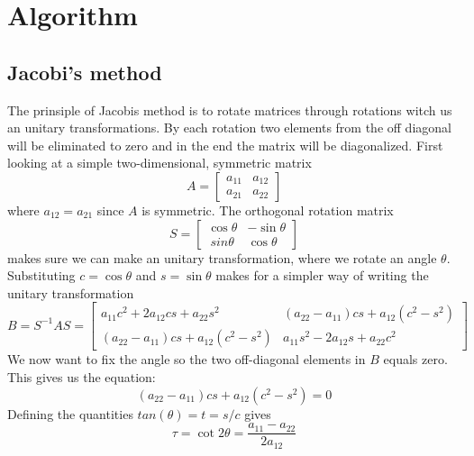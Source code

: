 \documentclass{article}
\begin{document}
\section{Algorithm}

\subsection{Jacobi's method}

The prinsiple of Jacobis method is to rotate matrices through rotations witch us an unitary transformations. By each rotation two elements from the off diagonal will be eliminated to zero and in the end the matrix will be diagonalized. First looking at a simple two-dimensional, symmetric matrix
\begin{equation}
	A = \begin{bmatrix}
				a_{11} & a_{12} \\
				a_{21} & a_{22}
			\end{bmatrix}
\end{equation}
where $a_{12}=a_{21}$ since $A$ is symmetric. The orthogonal rotation matrix
\begin{equation}
	S = \begin{bmatrix}
		\cos{\theta} & -\sin{\theta} \\
\		sin{\theta} & \cos{\theta}
\end{bmatrix}
\end{equation}
makes sure we can make an unitary transformation, where we rotate an angle $\theta$. Substituting $c=\cos{\theta}$ and $s=\sin{\theta}$ makes for a simpler way of writing the unitary transformation
\begin{equation}
	B = S^{-1}AS=\begin{bmatrix}
		a_{11}c^2+2a_{12}cs + a_{22}s^2 & (a_{22}-a_{11})cs+a_{12}(c^2-s^2) \\
(		a_{22}-a_{11})cs + a_{12}(c^2-s^2) & a_{11}s^2-2a_{12}s+a_{22}c^2
\end{bmatrix}
\end{equation}
We now want to fix the angle so the two off-diagonal elements in $B$ equals zero. This gives us the equation:
\begin{equation}
(a_{22}-a_{11})cs + a_{12}(c^2-s^2)=0
\end{equation}
Defining the quantities $tan(\theta) = t = s/c$  gives
\begin{equation}
\tau = \cot{2\theta} = \frac{a_{11}-a_{22}}{2a_{12}}
\end{equation}
\end{document}
